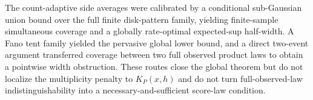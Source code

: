 The count-adaptive side averages were calibrated by a conditional sub-Gaussian union bound over the full finite disk-pattern family, yielding finite-sample simultaneous coverage and a globally rate-optimal expected-sup half-width.  A Fano tent family yielded the pervasive global lower bound, and a direct two-event argument transferred coverage between two full observed product laws to obtain a pointwise width obstruction.  These routes close the global theorem but do not localize the multiplicity penalty to \(K_P(x,h)\) and do not turn full-observed-law indistinguishability into a necessary-and-sufficient score-law condition.